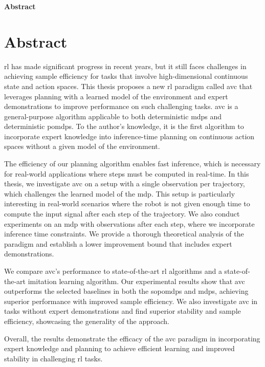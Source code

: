 \clearemptydoublepage
{}
{}

\vspace*{2cm}
\begin{center}
{\Large \textbf{Abstract}}
\end{center}
\vspace{1cm}

\chapter*{Abstract}
\label{chapter:Abstract}

\ac{rl} has made significant progress in recent years, but it still faces challenges in achieving sample efficiency for tasks that involve high-dimensional continuous state and action spaces. 
This thesis proposes a new \ac{rl} paradigm called \ac{avc} that leverages planning with a learned model of the environment and expert demonstrations to improve performance on such challenging tasks. 
\ac{avc} is a general-purpose algorithm applicable to both deterministic \ac{mdp}s and deterministic \ac{pomdp}s. To the author's knowledge, it is the first algorithm to incorporate expert knowledge 
into inference-time planning on continuous action spaces without a given model of the environment.

The efficiency of our planning algorithm enables fast inference, which is necessary for real-world applications where steps must be computed in real-time. In this thesis, we investigate 
\ac{avc} on a setup with a single observation per trajectory, which challenges the learned model of the \ac{mdp}. This setup is particularly interesting in real-world scenarios where the 
robot is not given enough time to compute the input signal after each step of the trajectory. We also conduct experiments on an \ac{mdp} with observations after each step, where we incorporate 
inference time constraints. We provide a thorough theoretical analysis of the paradigm and establish a lower improvement bound that includes expert demonstrations.

We compare \ac{avc}'s performance to state-of-the-art \ac{rl} algorithms and a state-of-the-art imitation learning algorithm. Our experimental results show that \ac{avc} outperforms the selected 
baselines in both the \ac{sopomdp}s and \ac{mdp}s, achieving superior performance with improved sample efficiency. We also investigate \ac{avc} in tasks without expert demonstrations and 
find superior stability and sample efficiency, showcasing the generality of the approach.

Overall, the results demonstrate the efficacy of the \ac{avc} paradigm in incorporating expert knowledge and planning to achieve efficient learning and improved stability in challenging \ac{rl} tasks.